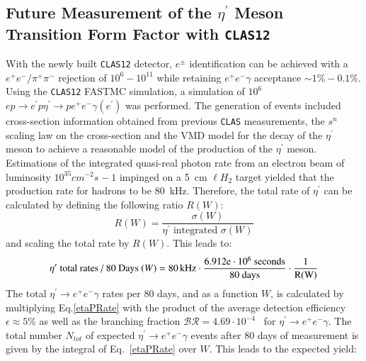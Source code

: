 \documentclass[epj]{webofc}
\def\etaP{\eta^{\prime}}
\def\epem{e^+e^-}
\begin{document}
\subsection{Future Measurement of the $\eta^\prime$ Meson Transition Form Factor with \textsc{\texttt{CLAS12}}}
With the newly built \textsc{\texttt{CLAS12}} detector, $e^{\pm}$ identification can be achieved with a $e^{+}e^{-}/\pi^{+}\pi^{-}$ rejection of  $10^{6}-10^{11}$ while retaining $e^+ e^- \gamma$ acceptance $\sim 1 \% - 0.1 \%$.
\FloatBarrier
Using the \textsc{\texttt{CLAS12}} FASTMC simulation, a simulation of $10^6$ $e p \to e^{\prime} p \eta^{\prime}  \to p e^+ e^- \gamma (e^{\prime})$ was performed. The generation of events included cross-section information obtained from previous \textsc{\texttt{CLAS}} measurements, the $s^n$ scaling law on the cross-section and the VMD model for the decay of the $\eta^{\prime}$ meson to achieve a reasonable model of the production of the $\eta^{\prime} $ meson. Estimations of the integrated quasi-real photon rate from an electron beam of luminosity $10^{35}cm^{-2}s^{}-1$ impinged on a 5~cm $\ell H_2$ target yielded that the production rate for hadrons to be 80~kHz. Therefore, the total rate of $\eta^{\prime}$ can be calculated by defining the following ratio $R(W)$: 
\begin{equation}
R(W) = \frac{\sigma(W)}{\eta^{\prime} \text{ integrated } \sigma(W)}
\label{XsecR}
\end{equation}
and scaling the total rate by $R(W)$. This leads to:
\begin{equation}
\eta^{\prime}\text{ total rates / 80 Days }(W) = 80\,\rm{kHz}\cdot \frac{6.912e\cdot10^6\mathrm{\ seconds}}{\text{80 days}}\cdot \frac{1}{R(W)}
\label{etaPRate}
\end{equation}
The total $\etaP\rightarrow\epem\gamma$ rates per 80 days, and as a function $W$, is calculated by multiplying Eq.\ref{etaPRate} with the product of the average detection efficiency $\epsilon\approx 5\%$ as well as the branching fraction $\mathcal{BR} = 4.69\cdot10^{-4}$~\cite{bib7} for $\etaP\rightarrow\epem\gamma$. The total number $N_{tot}$ of expected $\etaP\rightarrow\epem\gamma$ events after 80 days of measurement is given by the integral of Eq.~\ref{etaPRate} over $W$. This leads to the expected yield:
\end{document}
